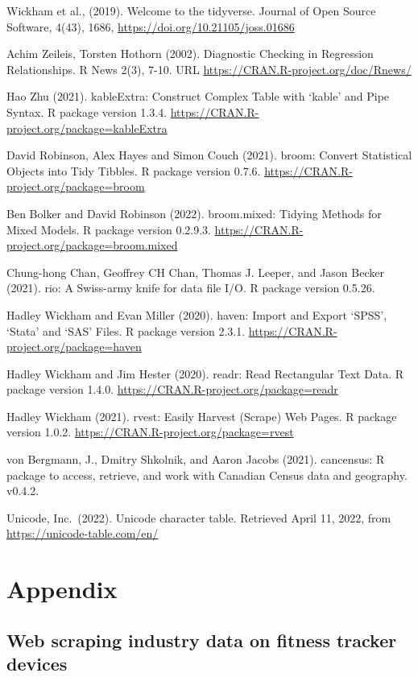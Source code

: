 \documentclass[
          english,
          paper=a4,
              ,captions=tableheading
  ]{scrartcl}
\begin{document}
Wickham et al., (2019). Welcome to the tidyverse. Journal of Open Source
Software, 4(43), 1686, \url{https://doi.org/10.21105/joss.01686}

Achim Zeileis, Torsten Hothorn (2002). Diagnostic Checking in Regression
Relationships. R News 2(3), 7-10. URL
\url{https://CRAN.R-project.org/doc/Rnews/}

Hao Zhu (2021). kableExtra: Construct Complex Table with `kable' and
Pipe Syntax. R package version 1.3.4.
\url{https://CRAN.R-project.org/package=kableExtra}

David Robinson, Alex Hayes and Simon Couch (2021). broom: Convert
Statistical Objects into Tidy Tibbles. R package version 0.7.6.
\url{https://CRAN.R-project.org/package=broom}

Ben Bolker and David Robinson (2022). broom.mixed: Tidying Methods for
Mixed Models. R package version 0.2.9.3.
\url{https://CRAN.R-project.org/package=broom.mixed}

Chung-hong Chan, Geoffrey CH Chan, Thomas J. Leeper, and Jason Becker
(2021). rio: A Swiss-army knife for data file I/O. R package version
0.5.26.

Hadley Wickham and Evan Miller (2020). haven: Import and Export `SPSS',
`Stata' and `SAS' Files. R package version 2.3.1.
\url{https://CRAN.R-project.org/package=haven}

Hadley Wickham and Jim Hester (2020). readr: Read Rectangular Text Data.
R package version 1.4.0. \url{https://CRAN.R-project.org/package=readr}

Hadley Wickham (2021). rvest: Easily Harvest (Scrape) Web Pages. R
package version 1.0.2. \url{https://CRAN.R-project.org/package=rvest}

von Bergmann, J., Dmitry Shkolnik, and Aaron Jacobs (2021). cancensus: R
package to access, retrieve, and work with Canadian Census data and
geography. v0.4.2.

Unicode, Inc.~(2022). Unicode character table. Retrieved April 11, 2022,
from \url{https://unicode-table.com/en/}

\newpage

\hypertarget{appendix}{%
\section{Appendix}\label{appendix}}

\hypertarget{web-scraping-industry-data-on-fitness-tracker-devices}{%
\subsection{Web scraping industry data on fitness tracker
devices}\label{web-scraping-industry-data-on-fitness-tracker-devices}}
\end{document}
